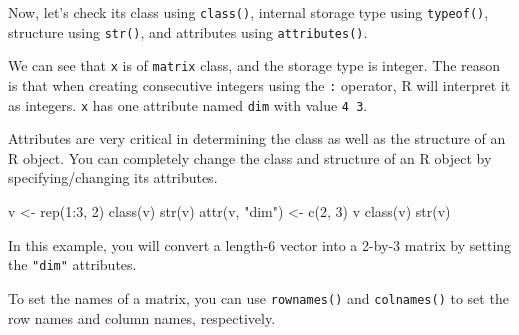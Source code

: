 \documentclass[
]{book}
\newenvironment{Shaded}{\begin{snugshade}}{\end{snugshade}}
\newcommand{\CommentTok}[1]{\textcolor[rgb]{0.56,0.35,0.01}{\textit{#1}}}
\newcommand{\DecValTok}[1]{\textcolor[rgb]{0.00,0.00,0.81}{#1}}
\newcommand{\FunctionTok}[1]{\textcolor[rgb]{0.00,0.00,0.00}{#1}}
\newcommand{\NormalTok}[1]{#1}
\newcommand{\OtherTok}[1]{\textcolor[rgb]{0.56,0.35,0.01}{#1}}
\newcommand{\SpecialCharTok}[1]{\textcolor[rgb]{0.00,0.00,0.00}{#1}}
\newcommand{\StringTok}[1]{\textcolor[rgb]{0.31,0.60,0.02}{#1}}
\newenvironment{blackbox}{
  \definecolor{shadecolor}{rgb}{0, 0, 0}  %
  \color{white}
  \begin{shaded}}
 {\end{shaded}}
\newenvironment{infobox}[1]
  {
  \begin{itemize}
  \renewcommand{\labelitemi}{
    \raisebox{-.7\height}[0pt][0pt]{
      {\setkeys{Gin}{width=3em,keepaspectratio}
        \texttt{[image: pics/\#1]}}
    }
  }
  \setlength{\fboxsep}{1em}
  \begin{blackbox}
  \item
  }
  {
  \end{blackbox}
  \end{itemize}
  }
\begin{document}
Now, let's check its class using \texttt{class()}, internal storage type using \texttt{typeof()}, structure using \texttt{str()}, and attributes using \texttt{attributes()}.

\begin{Shaded}
\end{Shaded}

We can see that \texttt{x} is of \texttt{matrix} class, and the storage type is integer. The reason is that when creating consecutive integers using the \texttt{:} operator, R will interpret it as integers. \texttt{x} has one attribute named \texttt{dim} with value \texttt{4\ 3}.

\begin{infobox}{caution}
Attributes are very critical in determining the class as well as the structure of an R object. You can completely change the class and structure of an R object by specifying/changing its attributes.

\begin{Shaded}
\begin{Highlighting}[]
\NormalTok{v }\OtherTok{\textless{}{-}} \FunctionTok{rep}\NormalTok{(}\DecValTok{1}\SpecialCharTok{:}\DecValTok{3}\NormalTok{, }\DecValTok{2}\NormalTok{)}
\FunctionTok{class}\NormalTok{(v)}
\FunctionTok{str}\NormalTok{(v)}
\FunctionTok{attr}\NormalTok{(v, }\StringTok{"dim"}\NormalTok{) }\OtherTok{\textless{}{-}} \FunctionTok{c}\NormalTok{(}\DecValTok{2}\NormalTok{, }\DecValTok{3}\NormalTok{)}
\NormalTok{v}
\FunctionTok{class}\NormalTok{(v)}
\FunctionTok{str}\NormalTok{(v)}
\end{Highlighting}
\end{Shaded}

In this example, you will convert a length-6 vector into a 2-by-3 matrix by setting the \texttt{"dim"} attributes.

\end{infobox}

To set the names of a matrix, you can use \texttt{rownames()} and \texttt{colnames()} to set the row names and column names, respectively.
\end{document}
